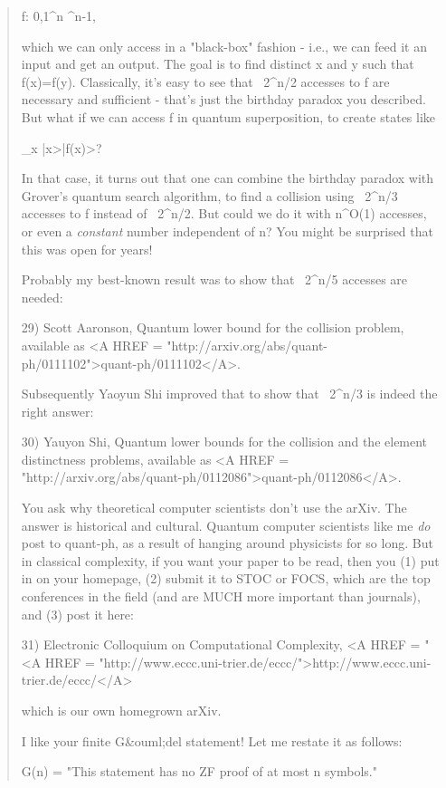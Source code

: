 \begin{quote}
  f: {0,1}^{n} ^{n-1}, 

  which we can only access in a "black-box" fashion - i.e., we can feed 
  it an input and get an output.  The goal is to find distinct x and y 
  such that f(x)=f(y).  Classically, it's easy to see that ~2^{n/2} 
  accesses 
  to f are necessary and sufficient - that's just the birthday paradox you 
  described.  But what if we can access f in quantum superposition, to 
  create states like
 
  \sum_{x} |x>|f(x)>?

  In that case, it turns out that one can combine the birthday paradox with 
  Grover's quantum search algorithm, to find a collision using ~2^{n/3}
  accesses to f instead of ~2^{n/2}.  But could we do it with 
  n^{O(1)} 
  accesses, or even a \emph{constant} number independent of n?  You might be 
  surprised that this was open for years!
 
  Probably my best-known result was to show that ~2^{n/5} accesses are 
  needed:

29) Scott Aaronson, Quantum lower bound for the collision problem,
available as
<A HREF = "http://arxiv.org/abs/quant-ph/0111102">quant-ph/0111102</A>.

Subsequently Yaoyun Shi improved that to 
  show that ~2^{n/3} is indeed the right answer:


30) Yauyon Shi, Quantum lower bounds for the collision and the element
distinctness problems, available as
 <A HREF = "http://arxiv.org/abs/quant-ph/0112086">quant-ph/0112086</A>.

  You ask why theoretical computer scientists don't use the arXiv.  The 
  answer is historical and cultural.  Quantum computer scientists like 
  me \emph{do} post to quant-ph, as a result of hanging around physicists for 
  so long.  But in classical complexity, if you want your paper to be read, 
  then you (1) put in on your homepage, (2) submit it to STOC or FOCS, 
  which are the top conferences in the field (and are MUCH more important 
  than journals), and (3) post it here:

31) 
Electronic Colloquium on Computational Complexity, 
<A HREF = "
<A HREF = "http://www.eccc.uni-trier.de/eccc/">http://www.eccc.uni-trier.de/eccc/</A>

 which is our own homegrown arXiv.

  I like your finite G&ouml;del statement!  Let me restate it as follows:
 
  G(n) = "This statement has no ZF proof of at most n symbols."
 

\end{quote}
